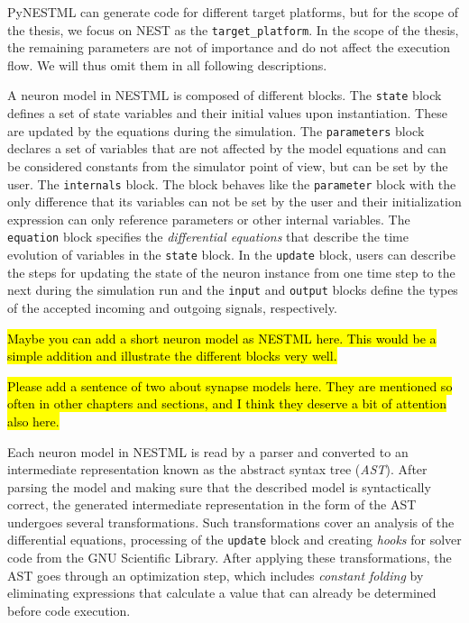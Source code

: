 PyNESTML can generate code for different target platforms, but for the scope of the thesis, we focus on NEST as the \texttt{target\_platform}. In the scope of the thesis, the remaining parameters are not of importance and do not affect the execution flow. We will thus omit them in all following descriptions.

A neuron model in NESTML is composed of different blocks. The \texttt{state} block defines a set of state variables and their initial values upon instantiation. These are updated by the equations during the simulation. The \texttt{parameters} block declares a set of variables that are not affected by the model equations and can be considered constants from the simulator point of view, but can be set by the user. The \texttt{internals} block. The block behaves like the \texttt{parameter} block with the only difference that its variables can not be set by the user and their initialization expression can only reference parameters or other internal variables. The \texttt{equation} block specifies the \emph{differential equations} that describe the time evolution of variables in the \texttt{state} block. In the \texttt{update} block, users can describe the steps for updating the state of the neuron instance from one time step to the next during the simulation run and the \texttt{input} and \texttt{output} blocks define the types of the accepted incoming and outgoing signals, respectively.

\hl{Maybe you can add a short neuron model as NESTML here. This would be a simple addition and illustrate the different blocks very well.}

\hl{Please add a sentence of two about synapse models here. They are mentioned so often in other chapters and sections, and I think they deserve a bit of attention also here.}

Each neuron model in NESTML is read by a parser and converted to an intermediate representation known as the abstract syntax tree (\emph{AST}). After parsing the model and making sure that the described model is syntactically correct, the generated intermediate representation in the form of the AST undergoes several transformations. Such transformations cover an analysis of the differential equations, processing of the \texttt{update} block and creating \emph{hooks} for solver code from the GNU Scientific Library. After applying these transformations, the AST goes through an optimization step, which includes \emph{constant folding} by eliminating expressions that calculate a value that can already be determined before code execution.

